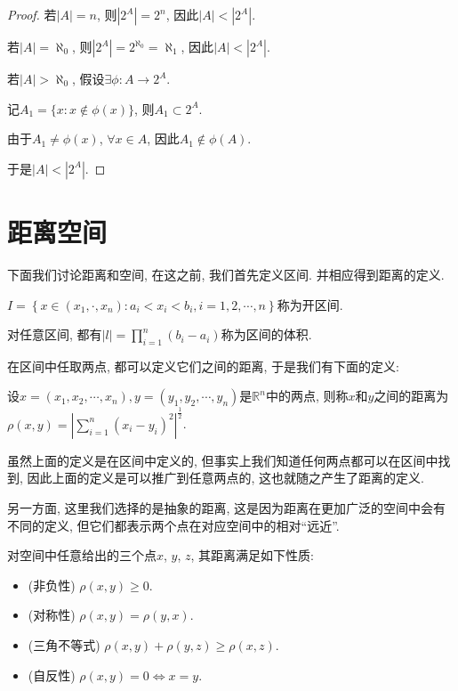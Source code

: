 \documentclass[theorem=false,mathfont=none,openany,sub3section]{easybook}
\begin{document}
\begin{proof}
  若$|A|=n$, 则$|2^{A}|=2^{n}$, 因此$|A|<|2^{A}|$.\par
  若$|A|=\aleph_{0}$, 则$|2^{A}|=2^{\aleph_{0}}=\aleph_{1}$, 因此$|A|<|2^{A}|$.\par
  若$|A|>\aleph_{0}$, 假设$\exists \phi: A\to 2^{A}$.\par
  记$A_1=\{x:x\notin \phi(x)\}$, 则$A_1\subset 2^{A}$.\par
  由于$A_1\ne \phi(x)$, $\forall x\in A$, 因此$A_1\notin \phi(A)$.\par
  于是$|A|<|2^{A}|$.\par
\end{proof}

\newpage

\section{距离空间}

下面我们讨论距离和空间, 在这之前, 我们首先定义区间. 并相应得到距离的定义.\par

\begin{definition}
  $I=\left\{x\in (x_1,\cdot, x_n): a_i<x_i<b_i,i=1,2,\cdots,n\right\}$称为开区间.\par
  对任意区间, 都有$|l|=\prod_{i=1}^{n}(b_i-a_i)$称为区间的体积.\par
\end{definition}

在区间中任取两点, 都可以定义它们之间的距离, 于是我们有下面的定义:\par
\begin{definition}
  设$x=(x_1,x_2,\cdots,x_n), y=(y_1,y_2,\cdots,y_n)$是$\mathbb{R}^n$中的两点, 则称$x$和$y$之间的距离为$\rho(x,y)=\left|\sum_{i=1}^{n}(x_i-y_i)^2\right|^{\frac{1}{2}}$.\par
\end{definition}

\begin{remark}
  虽然上面的定义是在区间中定义的, 但事实上我们知道任何两点都可以在区间中找到, 因此上面的定义是可以推广到任意两点的, 这也就随之产生了距离的定义.\par
  另一方面, 这里我们选择的是抽象的距离, 这是因为距离在更加广泛的空间中会有不同的定义, 但它们都表示两个点在对应空间中的相对“远近”.\par
\end{remark}

\begin{proposition}
  对空间中任意给出的三个点$x$, $y$, $z$, 其距离满足如下性质:\par
  \begin{itemize}
    \item (非负性) $\rho(x,y)\geqslant 0$.
    \item (对称性) $\rho(x,y)=\rho(y,x)$.
    \item (三角不等式) $\rho(x,y)+\rho(y,z)\geqslant \rho(x,z)$.
    \item (自反性) $\rho(x,y)=0\Leftrightarrow x=y$.
  \end{itemize}
\end{proposition}
\end{document}
